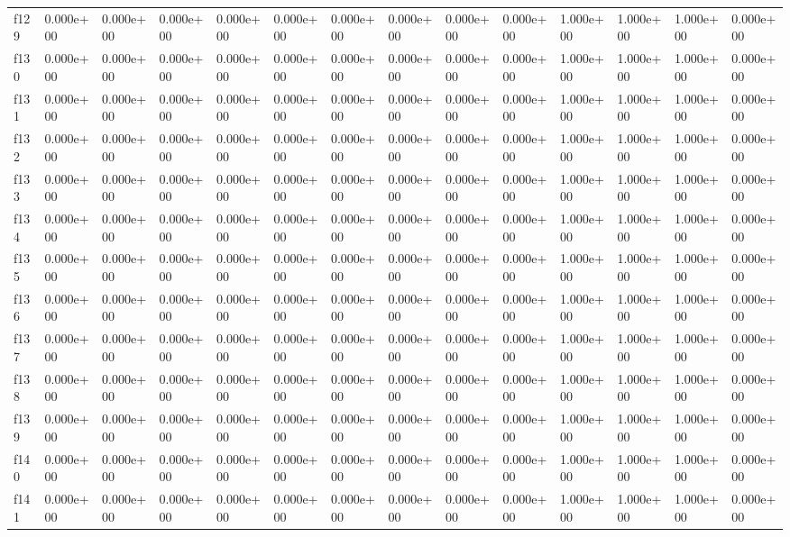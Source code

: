 \begin{table}
\begin{tabular}{llllllllllllll}
f129 & 0.000e+00 & 0.000e+00 & 0.000e+00 & 0.000e+00 & 0.000e+00 & 0.000e+00 & 0.000e+00 & 0.000e+00 & 0.000e+00 & 1.000e+00 & 1.000e+00 & 1.000e+00 & 0.000e+00 \\
f130 & 0.000e+00 & 0.000e+00 & 0.000e+00 & 0.000e+00 & 0.000e+00 & 0.000e+00 & 0.000e+00 & 0.000e+00 & 0.000e+00 & 1.000e+00 & 1.000e+00 & 1.000e+00 & 0.000e+00 \\
f131 & 0.000e+00 & 0.000e+00 & 0.000e+00 & 0.000e+00 & 0.000e+00 & 0.000e+00 & 0.000e+00 & 0.000e+00 & 0.000e+00 & 1.000e+00 & 1.000e+00 & 1.000e+00 & 0.000e+00 \\
f132 & 0.000e+00 & 0.000e+00 & 0.000e+00 & 0.000e+00 & 0.000e+00 & 0.000e+00 & 0.000e+00 & 0.000e+00 & 0.000e+00 & 1.000e+00 & 1.000e+00 & 1.000e+00 & 0.000e+00 \\
f133 & 0.000e+00 & 0.000e+00 & 0.000e+00 & 0.000e+00 & 0.000e+00 & 0.000e+00 & 0.000e+00 & 0.000e+00 & 0.000e+00 & 1.000e+00 & 1.000e+00 & 1.000e+00 & 0.000e+00 \\
f134 & 0.000e+00 & 0.000e+00 & 0.000e+00 & 0.000e+00 & 0.000e+00 & 0.000e+00 & 0.000e+00 & 0.000e+00 & 0.000e+00 & 1.000e+00 & 1.000e+00 & 1.000e+00 & 0.000e+00 \\
f135 & 0.000e+00 & 0.000e+00 & 0.000e+00 & 0.000e+00 & 0.000e+00 & 0.000e+00 & 0.000e+00 & 0.000e+00 & 0.000e+00 & 1.000e+00 & 1.000e+00 & 1.000e+00 & 0.000e+00 \\
f136 & 0.000e+00 & 0.000e+00 & 0.000e+00 & 0.000e+00 & 0.000e+00 & 0.000e+00 & 0.000e+00 & 0.000e+00 & 0.000e+00 & 1.000e+00 & 1.000e+00 & 1.000e+00 & 0.000e+00 \\
f137 & 0.000e+00 & 0.000e+00 & 0.000e+00 & 0.000e+00 & 0.000e+00 & 0.000e+00 & 0.000e+00 & 0.000e+00 & 0.000e+00 & 1.000e+00 & 1.000e+00 & 1.000e+00 & 0.000e+00 \\
f138 & 0.000e+00 & 0.000e+00 & 0.000e+00 & 0.000e+00 & 0.000e+00 & 0.000e+00 & 0.000e+00 & 0.000e+00 & 0.000e+00 & 1.000e+00 & 1.000e+00 & 1.000e+00 & 0.000e+00 \\
f139 & 0.000e+00 & 0.000e+00 & 0.000e+00 & 0.000e+00 & 0.000e+00 & 0.000e+00 & 0.000e+00 & 0.000e+00 & 0.000e+00 & 1.000e+00 & 1.000e+00 & 1.000e+00 & 0.000e+00 \\
f140 & 0.000e+00 & 0.000e+00 & 0.000e+00 & 0.000e+00 & 0.000e+00 & 0.000e+00 & 0.000e+00 & 0.000e+00 & 0.000e+00 & 1.000e+00 & 1.000e+00 & 1.000e+00 & 0.000e+00 \\
f141 & 0.000e+00 & 0.000e+00 & 0.000e+00 & 0.000e+00 & 0.000e+00 & 0.000e+00 & 0.000e+00 & 0.000e+00 & 0.000e+00 & 1.000e+00 & 1.000e+00 & 1.000e+00 & 0.000e+00 \\

\end{tabular}
\end{table}
